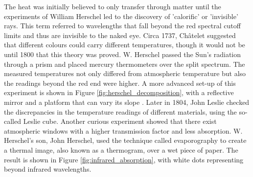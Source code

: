 \begin{kaobox}[frametitle=Discovery of infrared radiation]
The heat was initially believed to only transfer through matter until the experiments of William Herschel led to the discovery of 'calorific' or 'invisible' rays. This term referred to wavelengths that fall beyond the red spectral cutoff limits and thus are invisible to the naked eye. Circa 1737, Châtelet suggested that different colours could carry different temperatures, though it would not be until 1800 that this theory was proved. W. Herschel passed the Sun's radiation through a prism and placed mercury thermometers over the split spectrum. The measured temperatures not only differed from atmospheric temperature but also the readings beyond the red end were higher. A more advanced set-up of this experiment is shown in Figure \ref{fig:herschel_decomposition}, with a reflective mirror and a platform that can vary its slope \cite{ring_discovery_2000, minkina_how_2021, minkina_infrared_2009}. Later in 1804, John Leslie checked the discrepancies in the temperature readings of different materials, using the so-called Leslie cube. Another curious experiment showed that there exist atmospheric windows with a higher transmission factor and less absorption. W. Herschel's son, John Herschel, used the technique called evaporography to create a thermal image, also known as a thermogram, over a wet piece of paper. The result is shown in Figure \ref{fig:infrared_absorption}, with white dots representing beyond infrared wavelengths. 
\end{kaobox}

